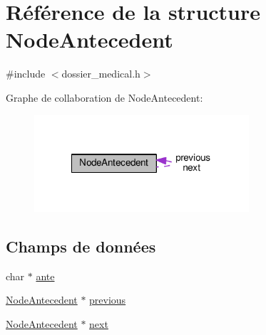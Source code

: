 \hypertarget{struct_node_antecedent}{\section{Référence de la structure Node\-Antecedent}
\label{struct_node_antecedent}
}


{\ttfamily \#include $<$dossier\-\_\-medical.\-h$>$}



Graphe de collaboration de Node\-Antecedent\-:
\nopagebreak
\begin{figure}[H]
\begin{center}
\leavevmode
\includegraphics[width=226pt]{struct_node_antecedent__coll__graph}
\end{center}
\end{figure}
\subsection*{Champs de données}
\begin{DoxyCompactItemize}
\item 
char $\ast$ \hyperlink{struct_node_antecedent_a0c3929ebda710960d6b68a88c77f2254}{ante}
\item 
\hyperlink{struct_node_antecedent}{Node\-Antecedent} $\ast$ \hyperlink{struct_node_antecedent_a92d57ada68813cf417c5471a1458927a}{previous}
\item 
\hyperlink{struct_node_antecedent}{Node\-Antecedent} $\ast$ \hyperlink{struct_node_antecedent_a8273a14f46fbc8204294f8db5e3ea9e6}{next}
\end{DoxyCompactItemize}



